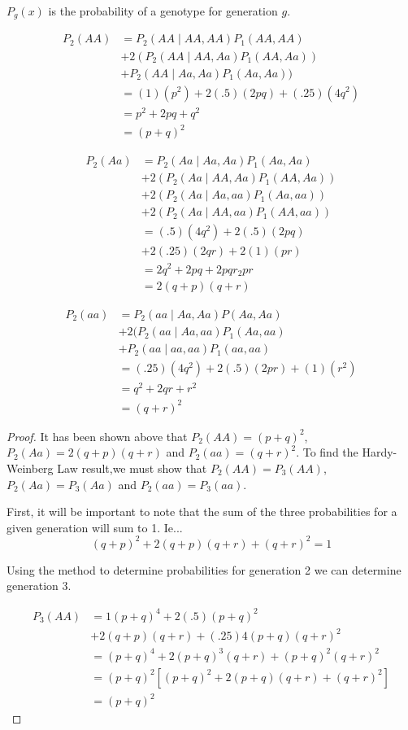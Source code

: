 \documentclass{tufte-book}
\theoremstyle{mytheoremstyle}
\theoremstyle{mylemstyle}
\theoremstyle{mydefstyle}
\begin{document}
\begin{enumerate}
$P_g(x)$ is the probability of a genotype for generation $g$.

\begin{align*}
P_2(AA) &= P_2(AA \mid AA,AA)P_1(AA,AA) \\
&+ 2(P_2(AA\mid AA, Aa)P_1(AA,Aa))\\
&+ P_2(AA \mid Aa, Aa)P_1(Aa,Aa))\\
&= (1)(p^2) + 2(.5)(2pq) + (.25)(4q^2)\\
&= p^2 + 2pq + q^2\\
&= (p+q)^2
\end{align*}

\begin{align*}
P_2(Aa) &= P_2(Aa \mid Aa,Aa)P_1(Aa,Aa)\\
&+ 2(P_2(Aa\mid AA, Aa)P_1(AA, Aa))\\
&+ 2(P_2(Aa\mid Aa, aa)P_1(Aa,aa))\\
&+ 2(P_2(Aa\mid AA,aa)P_1(AA,aa))\\
&= (.5)(4q^2) + 2(.5)(2pq) \\
&+ 2(.25)(2qr) + 2(1)(pr)\\
&= 2q^2+2pq+2pqr_2pr \\
&=2(q+p)(q+r)
\end{align*}

\begin{align*}
P_2(aa) &= P_2(aa \mid Aa,Aa)P(Aa,Aa)\\
&+ 2(P_2(aa\mid Aa,aa)P_1(Aa,aa)\\
&+ P_2(aa\mid aa,aa)P_1(aa,aa)\\
&= (.25)(4q^2) + 2(.5)(2pr) + (1)(r^2)\\
&= q^2 + 2qr + r^2\\
&= (q+r)^2
\end{align*}

\begin{proof} It has been shown above that $P_2(AA)=(p+q)^2$, $P_2(Aa)=2(q+p)(q+r)$ and $P_2(aa)=(q+r)^2$.  To find the Hardy-Weinberg Law result,we must show that $P_2(AA)=P_3(AA)$, $P_2(Aa)=P_3(Aa)$ and $P_2(aa)=P_3(aa)$.

First, it will be important to note that the sum of the three probabilities for a given generation will sum to 1.  Ie...
\[ (q+p)^2 + 2(q+p)(q+r) + (q+r)^2 = 1 \]

Using the method to determine probabilities for generation 2 we can determine generation 3.

\begin{align*}
P_3(AA) &= 1(p+q)^4 + 2(.5)(p+q)^2 \\
&+ 2(q+p)(q+r) + (.25)4(p+q)(q+r)^2 \\
&= (p+q)^4 + 2(p+q)^3(q+r)+(p+q)^2(q+r)^2 \\
&= (p+q)^2[(p+q)^2 + 2(p+q)(q+r) + (q+r)^2]\\
&= (p+q)^2
\end{align*}


\end{proof}
\end{enumerate}
\end{document}
